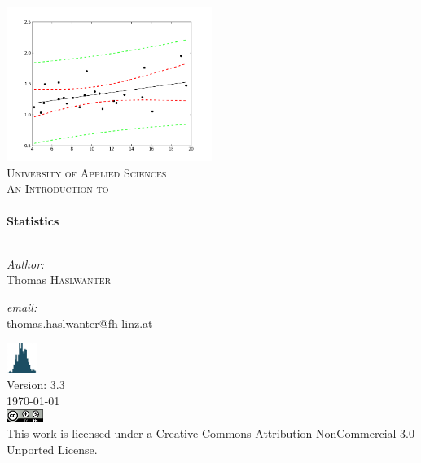 \begin{titlepage}

\begin{center}


\includegraphics[width=0.5\textwidth]{../Images/regression.png}\\[1cm]

\textsc{\LARGE University of Applied Sciences }\\[1.5cm]

\textsc{\Large An Introduction to}\\[0.5cm]


\HRule \\[0.4cm]
{ \huge \bfseries Statistics}\\[0.4cm]

\HRule \\[1.5cm]

\begin{minipage}{0.4\textwidth}
\begin{flushleft} \large
\emph{Author:}\\
Thomas \textsc{Haslwanter}
\end{flushleft}
\end{minipage}
\begin{minipage}{0.4\textwidth}
\begin{flushright} \large
\emph{email:} \\
{\small thomas.haslwanter@fh-linz.at}
\end{flushright}
\end{minipage}

\vfill

\includegraphics[width=1cm]{../Images/StatsLogo_green.png}\\
Version: 3.3 \\
{\large \today} \\[1cm]
\includegraphics[width=1.2cm]{../Images/cc_licence.png}\\
\footnotesize{This work is licensed under a Creative Commons Attribution-NonCommercial 3.0 Unported License.}


\end{center}

\end{titlepage}
